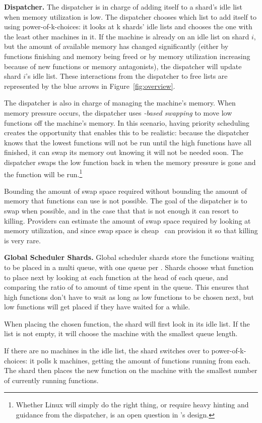 \textbf{Dispatcher.}
The dispatcher is in charge of adding itself to a shard's idle list when memory
utilization is low. The dispatcher chooses which list to add itself to using
power-of-k-choices: it looks at k shards' idle lists and chooses the one with
the least other machines in it. If the machine is already on an idle list on
shard $i$, but the amount of available memory has changed significantly (either
by functions finishing and memory being freed or by memory utilization
increasing because of new functions or memory antagonists), the dispatcher will
update shard $i$'s idle list. These interactions from the dispatcher to free
lists are represented by the blue arrows in Figure~\ref{fig:overview}.

The dispatcher is also in charge of managing the machine's memory. When memory
pressure occurs, the dispatcher uses \textit{\class{}-based swapping} to move
low \class{} functions off the machine's memory. In this scenario, having
priority scheduling creates the opportunity that enables this to be realistic:
because the dispatcher knows that the lowest \class{} functions will not be run
until the high \class{} functions have all finished, it can swap its memory out
knowing it will not be needed soon. The dispatcher swaps the low \class{}
function back in when the memory pressure is gone and the function will be
run.\footnote{Whether Linux will simply do the right thing, or require heavy
hinting and guidance from the dispatcher, is an open question in \sys{}'s
design.}

Bounding the amount of swap space required without bounding the amount of memory
that functions can use is not possible. The goal of the dispatcher is to swap
when possible, and in the case that that is not enough it can resort to killing.
Providers can estimate the amount of swap space required by looking at memory
utilization, and since swap space is cheap~\cite{ssd-price} can provision it so
that killing is very rare.

\textbf{Global Scheduler Shards.}
Global scheduler shards store the functions waiting to be placed in a multi
queue, with one queue per \priceclass{}. Shards choose what function to place
next by looking at each function at the head of each queue, and comparing the
ratio of \class{} to amount of time spent in the queue. This ensures that high
\class{} functions don't have to wait as long as low \class{} functions to be
chosen next, but low \class{} functions will get placed if they have waited for
a while.

When placing the chosen function, the shard will first look in its idle list. If
the list is not empty, it will choose the machine with the smallest queue
length.

If there are no machines in the idle list, the shard switches over to
power-of-k-choices: it polls k machines, getting the amount of functions running
from each. The shard then places the new function on the machine with the
smallest number of currently running functions. 
